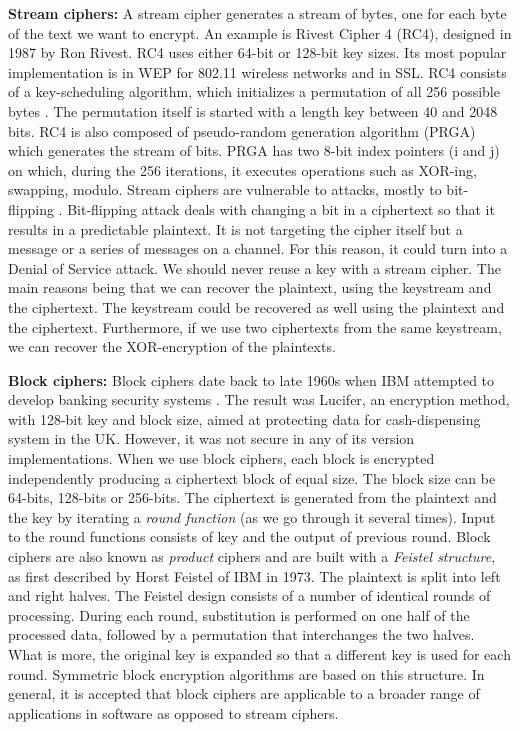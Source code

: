 \textbf{Stream ciphers:} A stream cipher generates a stream of bytes, one for each byte of the text we want to encrypt.  An example is Rivest Cipher 4 (RC4), designed in 1987 by Ron Rivest. RC4 uses either 64-bit or 128-bit key sizes. Its most popular implementation is in WEP for 802.11 wireless networks and in SSL. RC4 consists of a key-scheduling algorithm, which initializes a permutation of all 256 possible bytes \cite{stallings2017}. The permutation itself is started with a length key between 40 and 2048 bits. RC4 is also composed of pseudo-random generation algorithm (PRGA) which generates the stream of bits. PRGA has two 8-bit index pointers (i and j) on which, during the 256 iterations, it executes operations such as XOR-ing, swapping, modulo. Stream ciphers are vulnerable to attacks, mostly to bit-flipping \cite{wikirc4} . Bit-flipping attack deals with changing a bit in a ciphertext so that it results in a predictable plaintext. It is not targeting the cipher itself but a message or a series of messages on a channel. For this reason, it could turn into a Denial of Service attack. We should never reuse a key with a stream cipher. The main reasons being that we can recover the plaintext, using the keystream and the ciphertext. The keystream could be recovered as well using the plaintext and the ciphertext. Furthermore, if we use two ciphertexts from the same keystream, we can recover the XOR-encryption of the plaintexts.

\textbf{Block ciphers:} Block ciphers date back to late 1960s when IBM attempted to develop banking security systems \cite{ibmcrypto}. The result was Lucifer, an encryption method, with 128-bit key and block size, aimed at protecting data for cash-dispensing system in the UK. However, it was not secure in any of its version implementations. 
When we use block ciphers, each block is encrypted independently producing a ciphertext block of equal size. The block size can be 64-bits, 128-bits or 256-bits. The ciphertext is generated from the plaintext and the key by iterating a \emph{round function} (as we go through it several times). Input to the round functions consists of key and the output of previous round. Block ciphers are also known as \emph{product} ciphers and are built with a \emph{Feistel structure}, as first described by Horst Feistel of IBM in 1973. The plaintext is split into left and right halves. The Feistel design consists of a number of identical rounds of processing. During each round, substitution is performed on one half of the processed data, followed by a permutation that interchanges the two halves. What is more, the original key is expanded so that a different key is used for each round. Symmetric block encryption algorithms are based on this structure. In general, it is accepted that block ciphers are applicable to a broader range of applications in software as opposed to stream ciphers.


